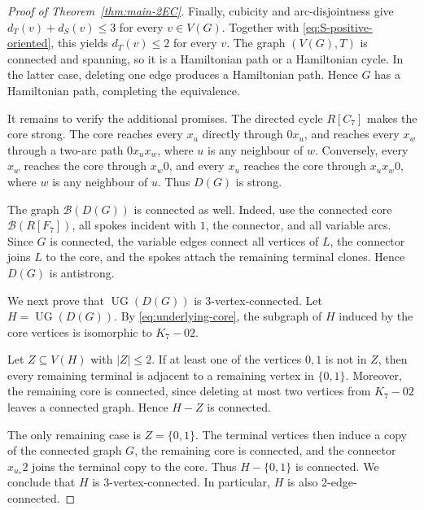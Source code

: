\documentclass[12pt]{article}
\theoremstyle{remark}
\newcommand{\UG}{\operatorname{UG}}
\newcommand{\cB}{\mathcal{B}}
\begin{document}
\begin{proof}[Proof of Theorem~\ref{thm:main-2EC}]
Finally, cubicity and arc-disjointness give $d_T(v)+d_S(v)\le 3$ for every $v\in V(G)$.
Together with \eqref{eq:S-positive-oriented}, this yields $d_T(v)\le 2$ for every $v$. The graph $(V(G),T)$ is connected and spanning, so it is a Hamiltonian path or a Hamiltonian cycle.
In the latter case, deleting one edge produces a Hamiltonian path. Hence $G$ has a Hamiltonian path, completing the equivalence.

It remains to verify the additional promises. The directed cycle $R[C_7]$ makes the core strong. The core reaches every $x_u$ directly through $0x_u$, and reaches every $x_w$ through a two-arc
path $0x_ux_w$, where $u$ is any neighbour of $w$.  Conversely, every $x_w$ reaches the core through $x_w0$, and every $x_u$ reaches the core through
$x_ux_w0$, where $w$ is any neighbour of $u$. Thus $D(G)$ is strong.

The graph $\cB(D(G))$ is connected as well. Indeed, use the connected core $\cB(R[F_7])$, all spokes incident with $1$, the connector, and all variable arcs. Since $G$ is connected, the variable edges connect all vertices of $L$, the connector joins $L$ to the core, and the spokes attach the remaining terminal clones. Hence $D(G)$ is antistrong.

We next prove that $\UG(D(G))$ is 3-vertex-connected. Let $H=\UG(D(G))$.
By \eqref{eq:underlying-core}, the subgraph of $H$ induced by the core vertices is isomorphic to $K_7-02$.

Let $Z\subseteq V(H)$ with $|Z|\le 2$. If at least one of the vertices $0,1$ is not in $Z$, then every remaining terminal is adjacent to a remaining vertex in $\{0,1\}$. Moreover, the remaining core is connected, since deleting at most two vertices from $K_7-02$ leaves a connected graph. Hence $H-Z$ is connected.

The only remaining case is
$Z=\{0,1\}$. The terminal vertices then induce a copy of the connected graph $G$, the remaining core is connected, and the connector
$x_{u_*}2$ joins the terminal copy to the core. Thus $H-\{0,1\}$ is connected. We conclude that $H$ is 3-vertex-connected. In particular, $H$ is also 2-edge-connected.


\end{proof}
\end{document}
